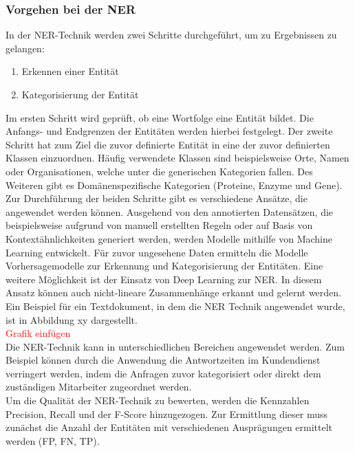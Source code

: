 \subsubsection{Vorgehen bei der NER}
In der NER-Technik werden zwei Schritte durchgeführt, um zu Ergebnissen zu gelangen:

\begin{enumerate}
    \item Erkennen einer Entität
    \item Kategorisierung der Entität
\end{enumerate}


Im ersten Schritt wird geprüft, ob eine Wortfolge eine Entität bildet. Die Anfangs- und Endgrenzen der Entitäten werden hierbei festgelegt. Der zweite Schritt hat zum Ziel die zuvor definierte Entität in eine der zuvor definierten Klassen einzuordnen.
Häufig verwendete Klassen sind beispielsweise Orte, Namen oder Organisationen, welche unter die generischen Kategorien fallen. Des Weiteren gibt es Domänenspezifische Kategorien (Proteine, Enzyme und Gene).
\\
Zur Durchführung der beiden Schritte gibt es verschiedene Ansätze, die angewendet werden können. Ausgehend von den annotierten Datensätzen, die beispielsweise aufgrund von manuell erstellten Regeln oder auf Basis von Kontextähnlichkeiten generiert werden, werden Modelle mithilfe von Machine Learning entwickelt.
Für zuvor ungesehene Daten ermitteln die Modelle Vorhersagemodelle zur Erkennung und Kategorisierung der Entitäten. Eine weitere Möglichkeit ist der Einsatz von Deep Learning zur NER. In diesem Ansatz können auch nicht-lineare Zusammenhänge erkannt und gelernt werden.
\\
Ein Beispiel für ein Textdokument, in dem die NER Technik angewendet wurde, ist in Abbildung xy dargestellt.\\
\textcolor{red}{Grafik einfügen} \\

Die NER-Technik kann in unterschiedlichen Bereichen angewendet werden. Zum Beispiel können durch die Anwendung die Antwortzeiten im Kundendienst verringert werden, indem die Anfragen zuvor kategorisiert oder direkt dem zuständigen Mitarbeiter zugeordnet werden.
\\
Um die Qualität der NER-Technik zu bewerten, werden die Kennzahlen Precision, Recall und der F-Score hinzugezogen.
Zur Ermittlung dieser muss zunächst die Anzahl der Entitäten mit verschiedenen Ausprägungen ermittelt werden (FP, FN, TP).

